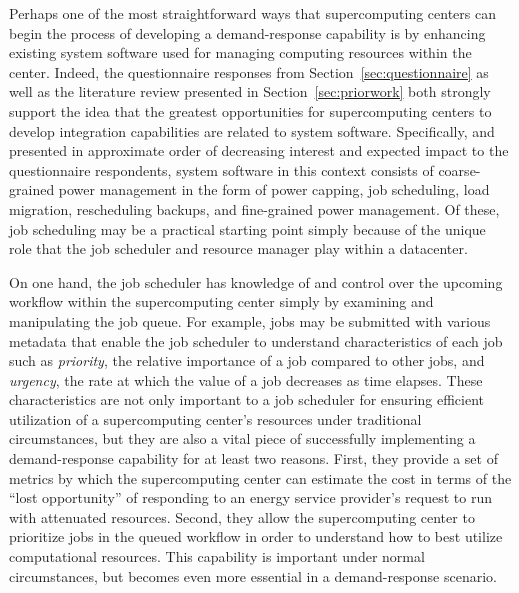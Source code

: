 Perhaps one of the most straightforward ways that supercomputing
centers can begin the process of developing a demand-response
capability is by enhancing existing system software used for managing
computing resources within the center.  Indeed, the questionnaire
responses from Section~\ref{sec:questionnaire} as well as the literature
review presented in Section~\ref{sec:priorwork} both strongly support the
idea that the greatest opportunities for supercomputing centers to
develop integration capabilities are related to system software.
Specifically, and presented in approximate order of decreasing
interest and expected impact to the questionnaire respondents, system
software in this context consists of coarse-grained power management
in the form of power capping, job scheduling, load migration,
rescheduling backups, and fine-grained power management.  Of these,
job scheduling may be a practical starting point simply because of the
unique role that the job scheduler and resource manager play within a
datacenter.

On one hand, the job scheduler has knowledge of and control over the
upcoming workflow within the supercomputing center simply by examining
and manipulating the job queue.  For example, jobs may be submitted
with various metadata that enable the job scheduler to understand
characteristics of each job such as \textit{priority}, the relative
importance of a job compared to other jobs, and \textit{urgency}, the
rate at which the value of a job decreases as time elapses.  These
characteristics are not only important to a job scheduler for ensuring
efficient utilization of a supercomputing center's resources under
traditional circumstances, but they are also a vital piece of
successfully implementing a demand-response capability for at least
two reasons.  First, they provide a set of metrics by which the
supercomputing center can estimate the cost in terms of the ``lost
opportunity'' of responding to an energy service provider's request to
run with attenuated resources.  Second, they allow the supercomputing
center to prioritize jobs in the queued workflow in order to understand
how to best utilize computational resources.  This capability is
important under normal circumstances, but becomes even more essential
in a demand-response scenario.

